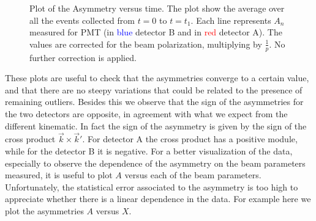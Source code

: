 \begin{figure}[hbtp]
\centering
{}
\caption{Plot of the Asymmetry versus time. The plot show the average over all the events collected from $t = 0$ to $t = t_{1}$. Each line represents $A_{n}$ measured for  PMT (in \textcolor{blue}{blue} detector B and in \textcolor{red}{red} detector A). The values are corrected for the beam polarization, multiplying by $\frac{1}{p}$. No further correction is applied.}
\label{fig:AsymOverTime}
\end{figure}

These plots are useful to check that the asymmetries converge to a certain value, and that there are no steepy variations that could be related to the presence of remaining outliers. Besides this we observe that the sign of the asymmetries for the two detectors are opposite, in agreement with what we expect from the different kinematic. In fact the sign of the asymmetry is given by the sign of the cross product $\vec{k} \times \vec{k}'$. For detector A the cross product has a positive module, while for the detector B it is negative.
For a better visualization of the data, especially to observe the dependence of the asymmetry on the beam parameters measured, it is useful to plot $A$ versus each of the beam parameters. Unfortunately, the statistical error associated to the asymmetry is too high to appreciate whether there is a linear dependence in the data. For example here we plot the asymmetries $A$ versus $X$.

